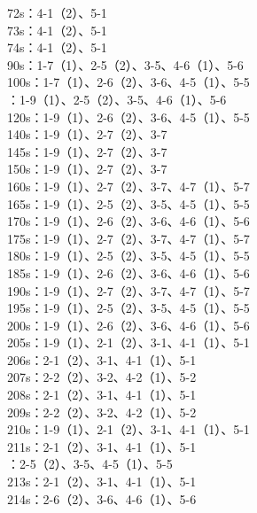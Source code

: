 \documentclass[a4paper,12pt]{article}
\begin{document}
		\indent 72s：4-1（2）、5-1\\
		\indent 73s：4-1（2）、5-1\\
		\indent 74s：4-1（2）、5-1\\
		\indent 90s：1-7（1）、2-5（2）、3-5、4-6（1）、5-6\\
		\indent 100s：1-7（1）、2-6（2）、3-6、4-5（1）、5-5\\
		：1-9（1）、2-5（2）、3-5、4-6（1）、5-6\\
		\indent 120s：1-9（1）、2-6（2）、3-6、4-5（1）、5-5\\
		\indent 140s：1-9（1）、2-7（2）、3-7\\
		\indent 145s：1-9（1）、2-7（2）、3-7\\
		\indent 150s：1-9（1）、2-7（2）、3-7\\
		\indent 160s：1-9（1）、2-7（2）、3-7、4-7（1）、5-7\\
		\indent 165s：1-9（1）、2-5（2）、3-5、4-5（1）、5-5\\
		\indent 170s：1-9（1）、2-6（2）、3-6、4-6（1）、5-6\\
		\indent 
		175s：1-9（1）、2-7（2）、3-7、4-7（1）、5-7\\
		\indent 180s：1-9（1）、2-5（2）、3-5、4-5（1）、5-5\\
		\indent 185s：1-9（1）、2-6（2）、3-6、4-6（1）、5-6\\
		\indent 
		190s：1-9（1）、2-7（2）、3-7、4-7（1）、5-7\\
		\indent 195s：1-9（1）、2-5（2）、3-5、4-5（1）、5-5\\
		\indent 200s：1-9（1）、2-6（2）、3-6、4-6（1）、5-6\\
		\indent 
		205s：1-9（1）、2-1（2）、3-1、4-1（1）、5-1\\
		\indent 
		206s：2-1（2）、3-1、4-1（1）、5-1\\
		\indent 207s：2-2（2）、3-2、4-2（1）、5-2\\
		\indent 208s：2-1（2）、3-1、4-1（1）、5-1\\
		\indent 209s：2-2（2）、3-2、4-2（1）、5-2\\
		\indent 210s：1-9（1）、2-1（2）、3-1、4-1（1）、5-1\\
		\indent 
		211s：2-1（2）、3-1、4-1（1）、5-1\\
		：2-5（2）、3-5、4-5（1）、5-5\\
		\indent 213s：2-1（2）、3-1、4-1（1）、5-1\\
		\indent 214s：2-6（2）、3-6、4-6（1）、5-6\\
\end{document}
